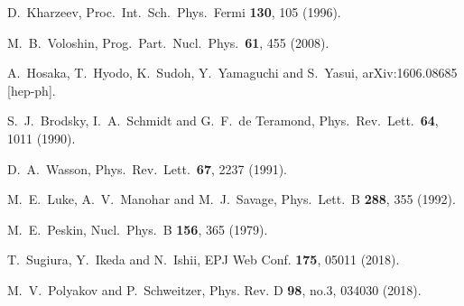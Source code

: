 \documentclass[10pt,prd,aps,nofootinbib,superscriptaddress]{revtex4}
\begin{document}
\begin{thebibliography}{99}

  D.~Kharzeev,
  Proc.\ Int.\ Sch.\ Phys.\ Fermi {\bf 130}, 105 (1996).

  M.~B.~Voloshin,
  Prog.\ Part.\ Nucl.\ Phys.\  {\bf 61}, 455 (2008).
  
  A.~Hosaka, T.~Hyodo, K.~Sudoh, Y.~Yamaguchi and S.~Yasui,
  arXiv:1606.08685 [hep-ph].

  S.~J.~Brodsky, I.~A.~Schmidt and G.~F.~de Teramond,
  Phys.\ Rev.\ Lett.\  {\bf 64}, 1011 (1990).
  
  D.~A.~Wasson,
  Phys.\ Rev.\ Lett.\  {\bf 67}, 2237 (1991).
  
    
  
  M.~E.~Luke, A.~V.~Manohar and M.~J.~Savage,
  Phys.\ Lett.\ B {\bf 288}, 355 (1992). 

  
  M.~E.~Peskin,
  Nucl.\ Phys.\ B {\bf 156}, 365 (1979).

T.~Sugiura, Y.~Ikeda and N.~Ishii,
EPJ Web Conf. \textbf{175}, 05011 (2018).


M.~V.~Polyakov and P.~Schweitzer,
Phys. Rev. D \textbf{98}, no.3, 034030 (2018).



\end{thebibliography}
\end{document}
